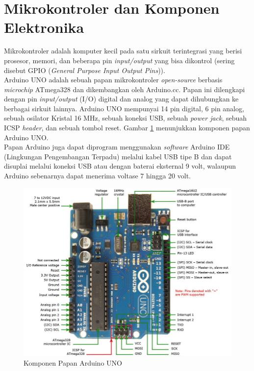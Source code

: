 \section{Mikrokontroler dan Komponen Elektronika}
\tab Mikrokontroler adalah komputer kecil pada satu sirkuit terintegrasi yang berisi prosesor, memori, dan beberapa pin \textit{input/output} yang bisa dikontrol (sering disebut GPIO (\textit{General Purpose Input Output Pins})).\\
\tab Arduino UNO adalah sebuah papan mikrokontroler \textit{open-source} berbasis \textit{microchip} ATmega328 dan dikembangkan oleh Arduino.cc.\cite{arduino-uno} Papan ini dilengkapi dengan pin \textit{input/output} (I/O) digital dan analog yang dapat dihubungkan ke berbagai sirkuit lainnya. Arduino UNO mempunyai 14 pin digital, 6 pin analog, sebuah osilator Kristal 16 MHz, sebuah koneksi USB, sebuah \textit{power jack}, sebuah ICSP \textit{header}, dan sebuah tombol reset. Gambar \ref{figure:arduino-uno-pinout} menunjukkan komponen papan Arduino UNO.\\
\tab Papan Arduino juga dapat diprogram menggunakan \textit{software} Arduino IDE (Lingkungan Pengembangan Terpadu) melalui kabel USB tipe B dan dapat disuplai melalui koneksi USB atau dengan baterai eksternal 9 volt, walaupun Arduino sebenarnya dapat menerima voltase 7 hingga 20 volt.

\begin{figure}[H]
	\centerline {
		\includegraphics[width=\linewidth]{bab3/img/arduino-uno-pinout.png}
	}
	\caption{Komponen Papan Arduino UNO}
	\label{figure:arduino-uno-pinout}
\end{figure}

